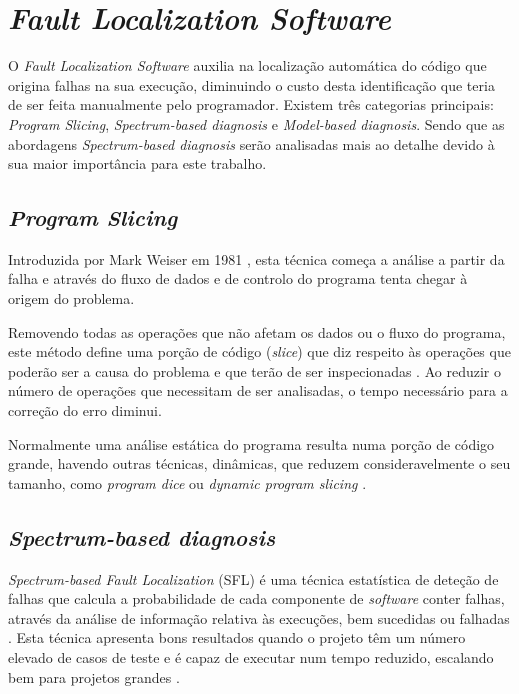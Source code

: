 \section{\emph{Fault Localization Software}}

O \emph{Fault Localization Software} auxilia na localização automática do código que origina falhas na sua execução, diminuindo o custo desta identificação que teria de ser feita manualmente pelo programador. Existem três categorias principais: \emph{Program Slicing}, \emph{Spectrum-based diagnosis} e \emph{Model-based diagnosis}. Sendo que as abordagens \emph{Spectrum-based diagnosis} serão analisadas mais ao detalhe devido à sua maior importância para este trabalho.

% 
%

\subsection{\emph{Program Slicing}}

Introduzida por Mark Weiser em 1981 \cite{Weiser1981, Weiser1982}, esta técnica começa a análise a partir da falha e através do fluxo de dados e de controlo do programa tenta chegar à origem do problema. 

Removendo todas as operações que não afetam os dados ou o fluxo do programa, este método define uma porção de código (\emph{slice}) que diz respeito às operações que poderão ser a causa do problema e que terão de ser inspecionadas \cite{Perez2004}. Ao reduzir o número de operações que necessitam de ser analisadas, o tempo necessário para a correção do erro diminui.

Normalmente uma análise estática do programa resulta numa porção de código grande, havendo outras técnicas, dinâmicas, que reduzem consideravelmente o seu tamanho, como \emph{program dice} ou \emph{dynamic program slicing} \cite{Perez2004}.

% 
%

\subsection{\emph{Spectrum-based diagnosis}}

\emph{Spectrum-based Fault Localization} (SFL) é uma técnica estatística de deteção de falhas  que calcula a probabilidade de cada componente de \emph{software} conter falhas, através da análise de informação relativa às execuções, bem sucedidas ou falhadas \cite{Abreu2007}. Esta técnica apresenta bons resultados quando o projeto têm um número elevado de casos de teste e é capaz de executar num tempo reduzido, escalando bem para projetos grandes \cite{Mayer2008}.

